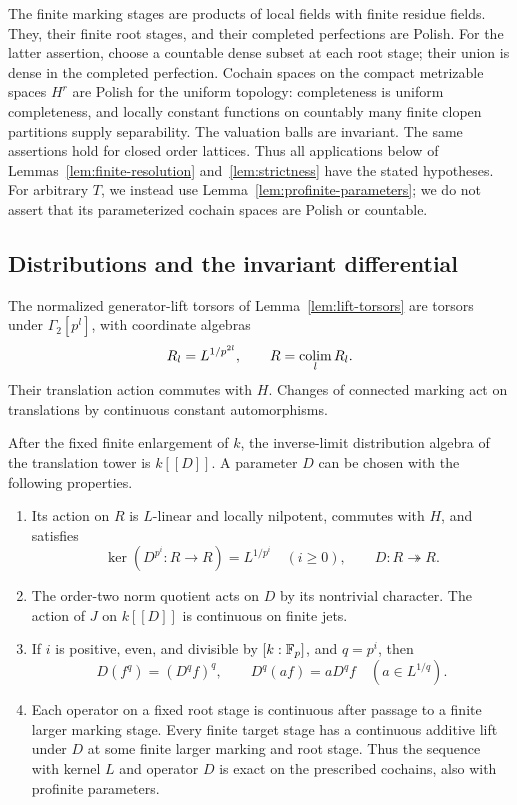 The finite marking stages are products of local fields with finite
residue fields.  They, their finite root stages, and their completed
perfections are Polish.  For the latter assertion, choose a
countable dense subset at each root stage; their union is dense
in the completed perfection.  Cochain spaces on the compact
metrizable spaces $H^r$ are Polish for the uniform topology:
completeness is uniform completeness, and locally constant functions
on countably many finite clopen partitions supply separability.
The valuation balls are invariant.  The same assertions hold for
closed order lattices.  Thus all applications below of
Lemmas~\ref{lem:finite-resolution} and~\ref{lem:strictness} have the
stated hypotheses.  For arbitrary $T$, we instead use
Lemma~\ref{lem:profinite-parameters}; we do not assert that its
parameterized cochain spaces are Polish or countable.

\subsection{Distributions and the invariant differential}

The normalized generator-lift torsors of Lemma~\ref{lem:lift-torsors}
are torsors under $\Gamma_2[p^l]$, with coordinate algebras
\[
 R_l=L^{1/p^{2l}},\qquad R=\operatorname*{colim}_l R_l.
\]
Their translation action commutes with $H$.  Changes of connected
marking act on translations by continuous constant automorphisms.

\begin{lemma}
\label{lem:distribution-operator}
After the fixed finite enlargement of $k$, the inverse-limit
distribution algebra of the translation tower is $k[[D]]$.  A
parameter $D$ can be chosen with the following properties.
\begin{enumerate}
\item Its action on $R$ is $L$-linear and locally nilpotent, commutes
with $H$, and satisfies
\begin{equation}
 \label{eq:distribution-kernels}
 \ker(D^{p^i}:R\to R)=L^{1/p^i}\quad(i\ge0),
 \qquad D:R\twoheadrightarrow R.
\end{equation}
\item The order-two norm quotient acts on $D$ by its nontrivial
character.  The action of $J$ on $k[[D]]$ is continuous on finite jets.
\item If $i$ is positive, even, and divisible by $[k:\mathbb F_p]$, and
$q=p^i$, then
\begin{equation}
 \label{eq:distribution-frobenius}
 D(f^q)=(D^qf)^q,\qquad
 D^q(af)=aD^qf\quad(a\in L^{1/q}).
\end{equation}
\item Each operator on a fixed root stage is continuous after passage
to a finite larger marking stage.  Every finite target stage has a
continuous additive lift under $D$ at some finite larger marking and
root stage.  Thus the sequence with kernel $L$ and operator $D$ is
exact on the prescribed cochains, also with profinite parameters.
\end{enumerate}
\end{lemma}


